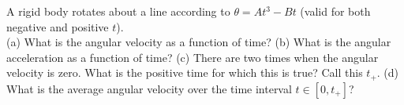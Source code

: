 A rigid body rotates about a line according to
$\theta = At^3-Bt$ (valid for both
negative and positive $t$).\\
%
(a) What is the angular velocity as a function of time?\hwendpart
%
(b) What is the angular acceleration as a function of time?\hwendpart
%
(c) There are two times when the angular velocity is zero. What is the
positive time for which this is true? Call this $t_+$.\hwendpart
%
(d) What is the average angular velocity over the time interval
$t \in [0,t_+]$?

